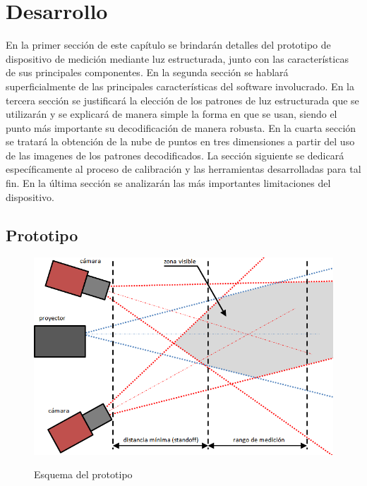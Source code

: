 \chapter{Desarrollo}\label{ch:desarrollo}

En la primer sección de este capítulo se brindarán detalles del prototipo de dispositivo de medición mediante luz estructurada, junto con las características de sus principales componentes. 
En la segunda sección se hablará superficialmente de las principales características del software involucrado.
En la tercera sección se justificará la elección de los patrones de luz estructurada que se utilizarán y se explicará de manera simple la forma en que se usan, siendo el punto más importante su decodificación de manera robusta. 
En la cuarta sección se tratará la obtención de la nube de puntos en tres dimensiones a partir del uso de las imagenes de los patrones decodificados. 
La sección siguiente se dedicará específicamente al proceso de calibración y las herramientas desarrolladas para tal fin. 
En la última sección se analizarán las más importantes limitaciones del dispositivo.

\section{Prototipo}

\begin{figure}[!bth]
    \myfloatalign
        {\includegraphics[width=1.0\linewidth]{images/setup/setupSchema}}
        \caption{Esquema del prototipo}
        \label{fig:prototypeDiagram}
\end{figure}


